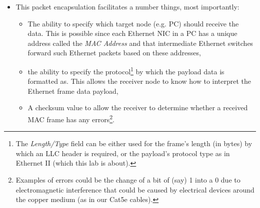 \documentclass[pdftex,12pt,a4paper]{article}
\begin{document}
\begin{itemize}
                \item This packet encapsulation facilitates a number things,
                most importantly:
                    \begin{itemize}
                        \item The ability to specify which target node (e.g.
                        PC) should receive the data.  This is possible since
                        each Ethernet NIC in a PC has a unique address called
                        the \emph{MAC Address} and that intermediate Ethernet
                        switches forward such Ethernet packets based on these
                        addresses,
                        \item the ability to specify the protocol\footnote{The
                        \emph{Length/Type} field can be either used for the frame's
                        length (in bytes) by which an LLC header is required,
                        or the payload's protocol type as in Ethernet II (which
                        this lab is about).} by
                        which the payload data is formatted as. This allows the
                        receiver node to know how to interpret the Ethernet
                        frame data payload,
                        \item A checksum value to allow the receiver to
                        determine whether a received MAC frame has any
                        errors\footnote{Examples of errors could be the change
                        of a bit of (say) 1 into a 0 due to electromagnetic
                        interference that could be caused by electrical devices
                        around the copper medium (as in our Cat5e cables).}.
                    \end{itemize}
                

\end{itemize}
\end{document}
